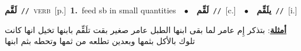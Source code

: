 \documentclass[10pt,a4paper,twoside]{article} %
\begin{document}
\begin{multicols}{2}
{\setlength\topsep{0pt}\textbf{\foreignlanguage{arabic}{لَقَّم}}\ {\color{gray}\texttt{//}\color{black}}\ \textsc{verb}\ [p.]\ \textbf{1.}~feed sb in small quantities\ \ $\bullet$\ \ \setlength\topsep{0pt}\textbf{\foreignlanguage{arabic}{لَقِّم}}\ {\color{gray}\texttt{//}\color{black}}\ [c.]\ \ $\bullet$\ \ \setlength\topsep{0pt}\textbf{\foreignlanguage{arabic}{يلَقِّم}}\ {\color{gray}\texttt{//}\color{black}}\ [i.]\  \begin{flushright}\color{gray}\foreignlanguage{arabic}{\textbf{\underline{\foreignlanguage{arabic}{أمثلة}}}: بتذكر إِم عامر لما بقى ابنها الطبل عامر صغير بقت تلَقِّم بابنها تخيل انها كانت تلوك بالأكل بثمها وبعدين تطلعه من ثمها وتحطه بثم ابنها}\end{flushright}\color{black}} \vspace{2mm}


\end{multicols}
\end{document}
